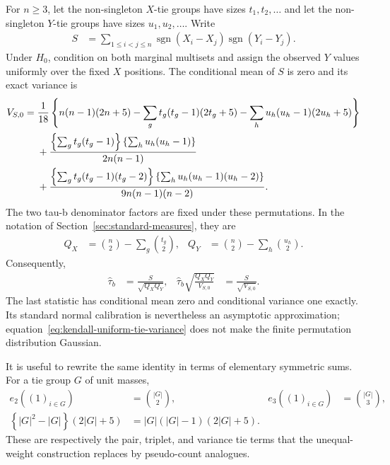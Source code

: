 For $n\geq3$, let the non-singleton $X$-tie groups have sizes
$t_1,t_2,\ldots$ and let the
non-singleton $Y$-tie groups have sizes $u_1,u_2,\ldots$. Write
\begin{align*}
 S
 &= \sum_{1\leq i<j\leq n}
 \operatorname{sgn}(X_i-X_j)\operatorname{sgn}(Y_i-Y_j).
\end{align*}
Under $H_0$, condition on both marginal multisets and assign the observed
$Y$ values uniformly over the fixed $X$ positions. The conditional mean of
$S$ is zero and its exact variance is \citep{kendall1945,kendall1947}
\begin{align}
 V_{S,0}
 ={}&
 \frac{1}{18}
 \left\{
 n(n-1)(2n+5)
 -\sum_g t_g(t_g-1)(2t_g+5)
 -\sum_h u_h(u_h-1)(2u_h+5)
 \right\}
 \notag\\
 &+
 \frac{
 \left\{\sum_g t_g(t_g-1)\right\}
 \left\{\sum_h u_h(u_h-1)\right\}
 }{2n(n-1)}
 \notag\\
 &+
 \frac{
 \left\{\sum_g t_g(t_g-1)(t_g-2)\right\}
 \left\{\sum_h u_h(u_h-1)(u_h-2)\right\}
 }{9n(n-1)(n-2)}.
 \label{eq:kendall-uniform-tie-variance}
\end{align}
The two tau-b denominator factors are fixed under these permutations. In the
notation of Section~\ref{sec:standard-measures}, they are
\begin{align*}
 Q_X
 &= \binom{n}{2}-\sum_g\binom{t_g}{2},
 &
 Q_Y
 &= \binom{n}{2}-\sum_h\binom{u_h}{2}.
\end{align*}
Consequently,
\begin{align*}
 \widehat\tau_b
 &= \frac{S}{\sqrt{Q_XQ_Y}},
 &
 \widehat\tau_b
 \sqrt{\frac{Q_XQ_Y}{V_{S,0}}}
 &= \frac{S}{\sqrt{V_{S,0}}}.
\end{align*}
The last statistic has conditional mean zero and conditional variance one
exactly. Its standard normal calibration is nevertheless an asymptotic
approximation; equation~\eqref{eq:kendall-uniform-tie-variance} does not make
the finite permutation distribution Gaussian.

It is useful to rewrite the same identity in terms of elementary symmetric
sums. For a tie group $G$ of unit masses,
\begin{align*}
 e_2((1)_{i\in G})
 &= \binom{|G|}{2},
 &
 e_3((1)_{i\in G})
 &= \binom{|G|}{3},\\
 \left\{|G|^2-|G|\right\}(2|G|+5)
 &= |G|(|G|-1)(2|G|+5).
\end{align*}
These are respectively the pair, triplet, and variance tie terms that the
unequal-weight construction replaces by pseudo-count analogues.


